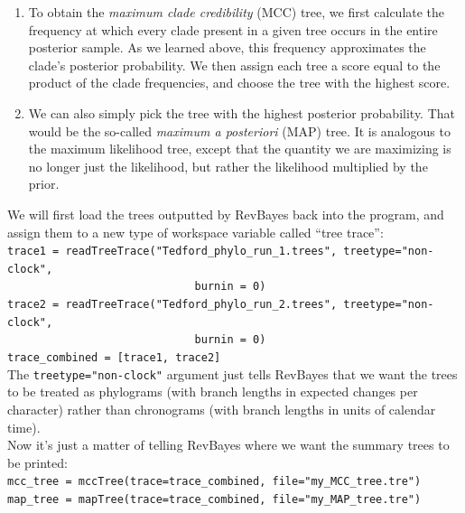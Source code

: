 \documentclass[12pt]{article}
\begin{document}
\begin{enumerate}
\item To obtain the \textit{maximum clade credibility} (MCC) tree, we first calculate the frequency at which every clade present in a given tree occurs in the entire posterior sample. As we learned above, this frequency approximates the clade's posterior probability. We then assign each tree a score equal to the product of the clade frequencies, and choose the tree with the highest score.
\item We can also simply pick the tree with the highest posterior probability. That would be the so-called \textit{maximum a posteriori} (MAP) tree. It is analogous to the maximum likelihood tree, except that the quantity we are maximizing is no longer just the likelihood, but rather the likelihood multiplied by the prior.
\end{enumerate}

\noindent We will first load the trees outputted by RevBayes back into the program, and assign them to a new type of workspace variable called ``tree trace'': \\

\indent \texttt{trace1 = readTreeTrace("Tedford\_phylo\_run\_1.trees", treetype="non-clock",} \\
\indent \texttt{\ \ \ \ \ \ \ \ \ \ \ \ \ \ \ \ \ \ \ \ \ \ \ \ \ \ \ \,\ burnin = 0)} \\
\indent \texttt{trace2 = readTreeTrace("Tedford\_phylo\_run\_2.trees", treetype="non-clock",} \\
\indent \texttt{\ \ \ \ \ \ \ \ \ \ \ \ \ \ \ \ \ \ \ \ \ \ \ \ \ \ \ \,\ burnin = 0)} \\
\indent \texttt{trace\_combined = [trace1, trace2]} \\

\noindent The \texttt{treetype="non-clock"} argument just tells RevBayes that we want the trees to be treated as phylograms (with branch lengths in expected changes per character) rather than chronograms (with branch lengths in units of calendar time). \\

\noindent Now it's just a matter of telling RevBayes where we want the summary trees to be printed: \\

\indent \texttt{mcc\_tree = mccTree(trace=trace\_combined, file="my\_MCC\_tree.tre")} \\
\indent \texttt{map\_tree = mapTree(trace=trace\_combined, file="my\_MAP\_tree.tre")} \\
\end{document}
